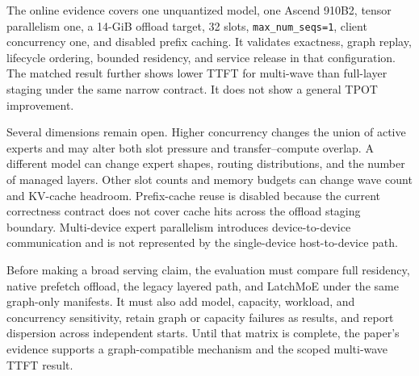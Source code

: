 The online evidence covers one unquantized model, one Ascend 910B2, tensor
parallelism one, a 14-GiB offload target, 32 slots, \texttt{max\_num\_seqs=1},
client concurrency one, and disabled prefix caching. It validates exactness,
graph replay, lifecycle ordering, bounded residency, and service release in
that configuration. The matched result further shows lower TTFT for multi-wave
than full-layer staging under the same narrow contract. It does not show a
general TPOT improvement.

Several dimensions remain open. Higher concurrency changes the union of active
experts and may alter both slot pressure and transfer--compute overlap. A
different model can change expert shapes, routing distributions, and the
number of managed layers. Other slot counts and memory budgets can change wave
count and KV-cache headroom. Prefix-cache reuse is disabled because the current
correctness contract does not cover cache hits across the offload staging
boundary. Multi-device expert parallelism introduces device-to-device
communication and is not represented by the single-device host-to-device
path.

Before making a broad serving claim, the evaluation must compare full
residency, native prefetch offload, the legacy layered path, and LatchMoE under
the same graph-only manifests. It must also add model, capacity, workload, and
concurrency sensitivity, retain graph or capacity failures as results, and
report dispersion across independent starts. Until that matrix is complete,
the paper's evidence supports a graph-compatible mechanism and the scoped
multi-wave TTFT result.

